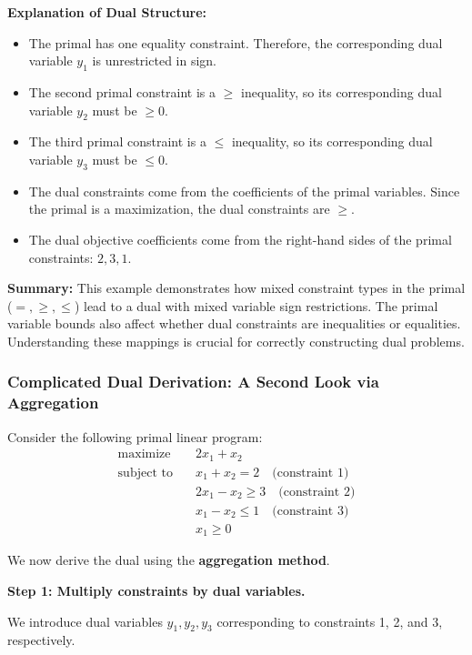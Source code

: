 \textbf{Explanation of Dual Structure:}
\begin{itemize}
    \item The primal has one equality constraint. Therefore, the corresponding dual variable \( y_1 \) is unrestricted in sign.
    \item The second primal constraint is a \( \geq \) inequality, so its corresponding dual variable \( y_2 \) must be \( \geq 0 \).
    \item The third primal constraint is a \( \leq \) inequality, so its corresponding dual variable \( y_3 \) must be \( \leq 0 \).
    \item The dual constraints come from the coefficients of the primal variables. Since the primal is a maximization, the dual constraints are \( \geq \).
    \item The dual objective coefficients come from the right-hand sides of the primal constraints: \( 2, 3, 1 \).
\end{itemize}

\textbf{Summary:}  
This example demonstrates how mixed constraint types in the primal (\( =, \geq, \leq \)) lead to a dual with mixed variable sign restrictions. The primal variable bounds also affect whether dual constraints are inequalities or equalities. Understanding these mappings is crucial for correctly constructing dual problems.

\subsubsection*{Complicated Dual Derivation: A Second Look via Aggregation}
{}\label{example:complicated-dual}
Consider the following primal linear program:
\[
\begin{aligned}
\text{maximize} \quad & 2x_1 + x_2 \\
\text{subject to} \quad
& x_1 + x_2 = 2 \quad \text{(constraint 1)} \\
& 2x_1 - x_2 \geq 3 \quad \text{(constraint 2)} \\
& x_1 - x_2 \leq 1 \quad \text{(constraint 3)} \\
& x_1 \geq 0
\end{aligned}
\]

We now derive the dual using the \textbf{aggregation method}.

\vspace{0.5em}
\textbf{Step 1: Multiply constraints by dual variables.}

We introduce dual variables \( y_1, y_2, y_3 \) corresponding to constraints 1, 2, and 3, respectively.

